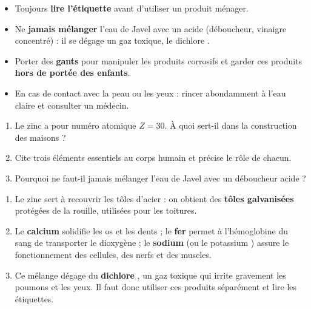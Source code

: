 \documentclass[11pt]{article}
\begin{document}
\begin{aretenir}
\begin{itemize}
\item Toujours \textbf{lire l'étiquette} avant d'utiliser un produit ménager.
\item Ne \textbf{jamais mélanger} l'eau de Javel avec un acide (déboucheur, vinaigre concentré) : il se dégage un gaz toxique, le dichlore .
\item Porter des \textbf{gants} pour manipuler les produits corrosifs et garder ces produits \textbf{hors de portée des enfants}.
\item En cas de contact avec la peau ou les yeux : rincer abondamment à l'eau claire et consulter un médecin.
\end{itemize}
\end{aretenir}

\begin{exercice}
\begin{enumerate}
\item Le zinc  a pour numéro atomique $Z = 30$. À quoi sert-il dans la construction des maisons ?
\item Cite trois éléments essentiels au corps humain et précise le rôle de chacun.
\item Pourquoi ne faut-il jamais mélanger l'eau de Javel avec un déboucheur acide ?
\end{enumerate}
\end{exercice}

\begin{corrige}
\begin{enumerate}
\item Le zinc sert à recouvrir les tôles d'acier : on obtient des \textbf{tôles galvanisées} protégées de la rouille, utilisées pour les toitures.
\item Le \textbf{calcium}  solidifie les os et les dents ; le \textbf{fer}  permet à l'hémoglobine du sang de transporter le dioxygène ; le \textbf{sodium}  (ou le potassium ) assure le fonctionnement des cellules, des nerfs et des muscles.
\item Ce mélange dégage du \textbf{dichlore} , un gaz toxique qui irrite gravement les poumons et les yeux. Il faut donc utiliser ces produits séparément et lire les étiquettes.
\end{enumerate}
\end{corrige}
\end{document}
